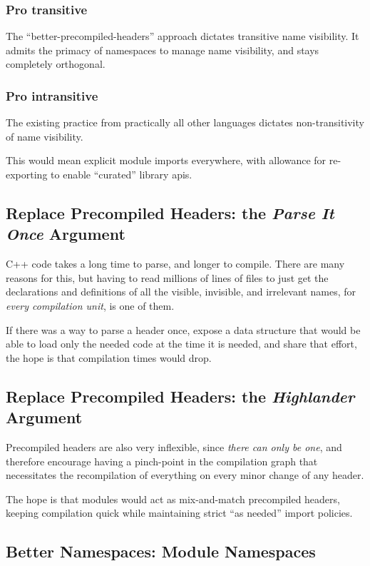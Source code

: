 \documentclass[reqno]{article}
\begin{document}
\subsubsection{Pro transitive}
The ``better-precompiled-headers'' approach dictates transitive name visibility.
It admits the primacy of namespaces to manage name visibility, and stays
completely orthogonal.

\subsubsection{Pro intransitive}
The existing practice from practically all other languages dictates
non-transitivity of name visibility.

This would mean explicit module imports everywhere, with allowance for
re-exporting to enable ``curated'' library apis.


\subsection{Replace Precompiled Headers: the \emph{Parse It Once} Argument}

C++ code takes a long time to parse, and longer to compile. There are many
reasons for this, but having to read millions of lines of files to just get the
declarations and definitions of all the visible, invisible, and irrelevant
names, for \emph{every compilation unit}, is one of them.

If there was a way to parse a header once, expose a data structure that would be
able to load only the needed code at the time it is needed, and share that
effort, the hope is that compilation times would drop.


\subsection{Replace Precompiled Headers: the \emph{Highlander} Argument}

Precompiled headers are also very inflexible, since \emph{there can only be
one}, and therefore encourage having a pinch-point in the compilation graph
that necessitates the recompilation of everything on every minor change of any
header.

The hope is that modules would act as mix-and-match precompiled headers,
keeping compilation quick while maintaining strict ``as needed'' import policies.


\subsection{Better Namespaces: Module Namespaces}
\end{document}

